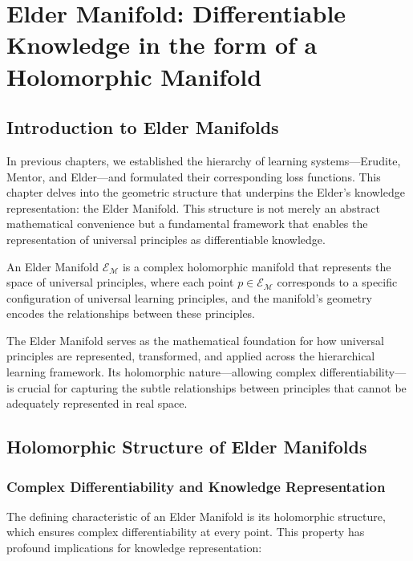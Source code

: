 \chapter{Elder Manifold: Differentiable Knowledge in the form of a Holomorphic Manifold}

\section{Introduction to Elder Manifolds}

In previous chapters, we established the hierarchy of learning systems—Erudite, Mentor, and Elder—and formulated their corresponding loss functions. This chapter delves into the geometric structure that underpins the Elder's knowledge representation: the Elder Manifold. This structure is not merely an abstract mathematical convenience but a fundamental framework that enables the representation of universal principles as differentiable knowledge.

\begin{definition}
An Elder Manifold $\mathcal{E}_{\mathcal{M}}$ is a complex holomorphic manifold that represents the space of universal principles, where each point $p \in \mathcal{E}_{\mathcal{M}}$ corresponds to a specific configuration of universal learning principles, and the manifold's geometry encodes the relationships between these principles.
\end{definition}

The Elder Manifold serves as the mathematical foundation for how universal principles are represented, transformed, and applied across the hierarchical learning framework. Its holomorphic nature—allowing complex differentiability—is crucial for capturing the subtle relationships between principles that cannot be adequately represented in real space.

\section{Holomorphic Structure of Elder Manifolds}

\subsection{Complex Differentiability and Knowledge Representation}

The defining characteristic of an Elder Manifold is its holomorphic structure, which ensures complex differentiability at every point. This property has profound implications for knowledge representation:

